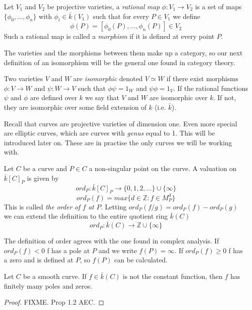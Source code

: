 \documentclass[a4paper,10pt]{amsart}
\begin{document}
\begin{mydef}
 Let $V_1$ and $V_2$ be projective varieties, a \emph{rational map} $\phi: V_1 \rightarrow V_2$
is a set of maps $\{\phi_0,\ldots,\phi_n\}$ with $\phi_i \in \bar{k}(V_1)$ such that for every
$P\in V_1$ we define
$$\phi(P) = [\phi_0(P),\ldots,\phi_n(P)] \in V_2$$
Such a rational map is called a \emph{morphism} if it is defined at every point $P$.
\end{mydef}

The varieties and the morphisms between them make up a category, so our next
definition of an isomorphism will be the general one found in category theory.

\begin{mydef}
 Two varieties $V$ and $W$ are \emph{isomorphic} denoted $V\simeq W$
if there exist morphisms $\phi: V \rightarrow W$ and $\psi: W \rightarrow V$ such that
$\phi \psi = 1_W$ and $\psi \phi = 1_V$.
If the rational functions $\psi$ and $\phi$ are defined over $k$ we say that $V$ and $W$
are isomorphic over $k$. If not, they are isomorphic over some field extension of $k$
(i.e. $\bar{k}$).
\end{mydef}

Recall that curves are projective varieties of dimension one. Even more special
are elliptic curves, which are curves with \emph{genus} equal to 1. This will
be introduced later on. These are in practise the only curves we will be working with.

\begin{mydef}
 Let $C$ be a curve and $P\in C$ a non-singular point on the curve. A valuation on
$\bar{k}[C]_P$ is given by
$$ ord_P : \bar{k}[C]_P \rightarrow \{ 0, 1, 2, \ldots \} \cup \{ \infty \} $$
$$ ord_P(f) = max \{ d\in \mathbb{Z} : f\in M_P^d \} $$
This is called \emph{the order of $f$ at $P$}.
Letting $ord_P(f/g) = ord_P(f) - ord_P(g)$ we can extend the definition to the entire
quotient ring $\bar{k}(C)$
$$ ord_P: \bar{k}(C) \rightarrow \mathbb{Z}\cup \{\infty \} $$
\end{mydef}

The definition of order agrees with the one found in complex analysis.
If $ord_P(f) < 0$ f has a pole at $P$ and we write $f(P)=\infty$. 
If $ord_P(f) \ge 0$ f has a zero and is defined at $P$, so $f(P)$ can be calculated. 

\begin{prop}
 Let $C$ be a smooth curve. If $f\in \bar{k}(C)$ is not the constant function, then
$f$ has finitely many poles and zeros.
\label{prop:1}
\end{prop}
\begin{proof}
 FIXME. Prop 1.2 AEC.
\end{proof}
\end{document}
